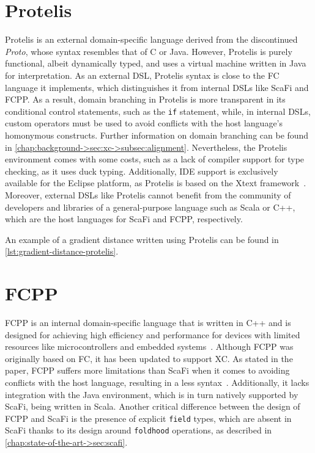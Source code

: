\section{Protelis} \label{chap:state-of-the-art->sec:protelis}

Protelis is an external domain-specific language derived from the discontinued \textit{Proto}, whose syntax resembles that of C or Java.
%
However, Protelis is purely functional, albeit dynamically typed, and uses a virtual machine written in Java~\cite{protelis} for interpretation.
%
As an external \ac{DSL}, Protelis syntax is close to the \ac{FC} language it implements, which distinguishes it from internal \acp{DSL} like ScaFi and FCPP.
%
As a result, domain branching in Protelis is more transparent in its conditional control statements, such as the \texttt{if} statement, while, in internal DSLs, custom operators must be used to avoid conflicts with the host language's homonymous constructs. 
%
Further information on domain branching can be found in \cref{chap:background->sec:xc->subsec:alignment}.
%
Nevertheless, the Protelis environment comes with some costs, such as a lack of compiler support for type checking, as it uses duck typing.
%
Additionally, IDE support is exclusively available for the Eclipse platform, as Protelis is based on the Xtext framework~\cite{xtext}.
%
Moreover, external \acp{DSL} like Protelis cannot benefit from the community of developers and libraries of a general-purpose language such as Scala or C++, which are the host languages for ScaFi and FCPP, respectively.

An example of a gradient distance written using Protelis can be found in \cref{lst:gradient-distance-protelis}.




\section{FCPP} \label{chap:state-of-the-art->sec:fcpp}

FCPP is an internal domain-specific language that is written in C++ and is designed for achieving high efficiency and performance for devices with limited resources like microcontrollers and embedded systems~\cite{fcpp}.
%
Although FCPP was originally based on \ac{FC}, it has been updated to support \ac{XC}.
%
As stated in the paper, FCPP suffers more limitations than ScaFi when it comes to avoiding conflicts with the host language, resulting in a less  syntax~\cite{fcpp}.
%
Additionally, it lacks integration with the Java environment, which is in turn natively supported by ScaFi, being written in Scala.
%
Another critical difference between the design of FCPP and ScaFi is the presence of explicit \texttt{field} types, which are absent in ScaFi thanks to its design around \texttt{foldhood} operations, as described in \cref{chap:state-of-the-art->sec:scafi}.

